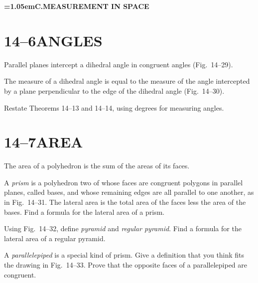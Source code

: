 \documentclass[11pt]{book}
\newcommand{\XIVpart}[1]{%
  \par\addvspace{1.5\baselineskip}\nopagebreak
  \begin{center}\bfseries\spaceskip=1.05em\relax #1\end{center}%
  \nopagebreak\addvspace{0.8\baselineskip}}
\begin{document}
\FIGXIVTWENTYEIGHT

\XIVpart{C.\quad MEASUREMENT IN SPACE}

\section*{14--6\quad ANGLES}

\begin{theorem}
Parallel planes intercept a dihedral angle in congruent angles (Fig.~14--29).
\end{theorem}

\begin{definition}
The measure of a dihedral angle is equal to the measure of the angle intercepted
by a plane perpendicular to the edge of the dihedral angle (Fig.~14--30).
\end{definition}

Restate Theorems 14--13 and 14--14, using degrees for measuring angles.

\FIGXIVTWENTYNINETHIRTY

\section*{14--7\quad AREA}

\begin{definition}
The area of a polyhedron is the sum of the areas of its faces.
\end{definition}

\begin{exercisecols}
\begin{exlist}
\item A \emph{prism} is a polyhedron two of whose faces are congruent polygons
      in parallel planes, called bases, and whose remaining edges are all
      parallel to one another, as in Fig.~14--31. The lateral area is the total
      area of the faces less the area of the bases. Find a formula for the
      lateral area of a prism.
\exfig{\FIGXIVTHIRTYONE}
\item Using Fig.~14--32, define \emph{pyramid} and \emph{regular pyramid}. Find
      a formula for the lateral area of a regular pyramid.
\exfig{\FIGXIVTHIRTYTWO}
\item A \emph{parallelepiped} is a special kind of prism. Give a definition that
      you think fits the drawing in Fig.~14--33. Prove that the opposite faces
      of a parallelepiped are congruent.
\exfig{\FIGXIVTHIRTYTHREE}
\end{exlist}
\end{exercisecols}
\end{document}

